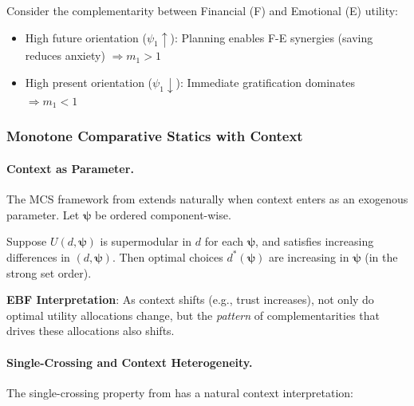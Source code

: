 \begin{example}
Consider the complementarity between Financial (F) and Emotional (E) utility:
\begin{itemize}
    \item High future orientation ($\psi_1 \uparrow$): Planning enables F-E synergies 
    (saving reduces anxiety) $\Rightarrow m_1 > 1$
    \item High present orientation ($\psi_1 \downarrow$): Immediate gratification 
    dominates $\Rightarrow m_1 < 1$
\end{itemize}
\end{example}

\subsubsection{Monotone Comparative Statics with Context}

\paragraph{Context as Parameter.}

The MCS framework from \citet{milgrom1994monotone} extends naturally when context 
enters as an exogenous parameter. Let $\boldsymbol{\psi}$ be ordered component-wise.

\begin{theorem}
\label{thm:context-mcs}
Suppose $U(d, \boldsymbol{\psi})$ is supermodular in $d$ for each $\boldsymbol{\psi}$, 
and satisfies increasing differences in $(d, \boldsymbol{\psi})$. Then optimal choices 
$d^*(\boldsymbol{\psi})$ are increasing in $\boldsymbol{\psi}$ (in the strong set order).
\end{theorem}

\textbf{EBF Interpretation}: As context shifts (e.g., trust increases), not only 
do optimal utility allocations change, but the \emph{pattern} of complementarities 
that drives these allocations also shifts.

\paragraph{Single-Crossing and Context Heterogeneity.}

The single-crossing property from \citet{milgrom1994monotone} has a natural 
context interpretation:

